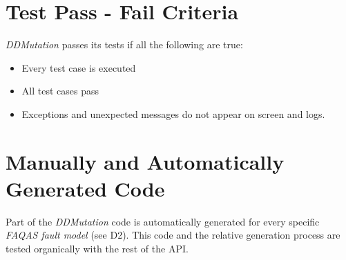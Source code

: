 \section{Test Pass - Fail Criteria}

\emph{DDMutation} passes its tests if all the following are true:
\begin{itemize}
	\item Every test case is executed
	\item All test cases pass
	\item Exceptions and unexpected messages do not appear on screen and logs.
\end{itemize}

\section{Manually and Automatically Generated Code}

Part of the \emph{DDMutation} code is automatically generated for every specific \emph{FAQAS fault model} (see D2). This code and the relative generation process are tested organically with the rest of the API.
